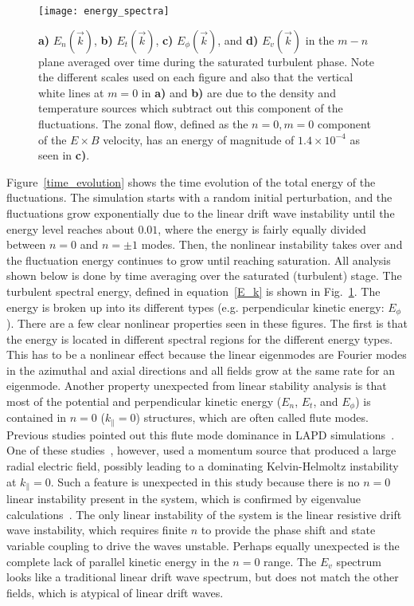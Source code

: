 \documentclass[showpacs,preprintnumbers,amsmath,amssymb,superscriptaddress,aip]{revtex4-1}
\def\para{\parallel}
\begin{document}
\begin{figure}[!htbp]
\texttt{[image: energy\_spectra]}
\hfil
\caption{\textbf{a)} $E_n(\vec{k})$, \textbf{b)} $E_t(\vec{k})$, \textbf{c)} $E_\phi(\vec{k})$, and \textbf{d)} $E_v(\vec{k})$ in the $m-n$ plane averaged over time during the saturated turbulent phase.
Note the different scales used on each figure and also that the vertical white lines at $m=0$ in \textbf{a)} and \textbf{b)} are due to the density and temperature sources which subtract out this
component of the fluctuations. The zonal flow, defined as the $n=0, m=0$ component of the $E \times B$ velocity, has an energy of magnitude of $1.4 \times 10^{-4}$ as seen in \textbf{c)}.}
\label{energy_figures}
\end{figure}

Figure~\ref{time_evolution} shows the time evolution of the total energy of the fluctuations. The simulation starts with a random initial perturbation, and the fluctuations grow
exponentially due to the linear drift wave instability until the energy level reaches about $0.01$, where the energy is fairly equally divided between $n=0$ and $n= \pm 1$ modes. 
Then, the nonlinear instability takes over and the fluctuation energy continues to grow
until reaching saturation. All analysis shown below is done by time averaging over the saturated (turbulent) stage.
The turbulent spectral energy, defined in equation~\ref{E_k} is shown in Fig.~\ref{energy_figures}. The energy is broken up into its different types (e.g. perpendicular kinetic energy: $E_\phi$).
There are a few clear nonlinear properties
seen in these figures. The first is that the energy is located in different spectral regions for the different energy types. This has to be a nonlinear effect because the linear eigenmodes
are Fourier modes in the azimuthal and axial directions and all fields grow at the same rate for an eigenmode. 
Another property unexpected from linear stability analysis is that most of the potential and perpendicular kinetic energy ($E_n$, $E_t$, and $E_\phi$) is contained in $n=0$ ($k_\para = 0$) 
structures, which are often called flute modes. Previous studies pointed out this flute mode dominance in LAPD simulations~\cite{rogers2010,Umansky2011}. One of these studies~\cite{rogers2010},
however, used a momentum source that produced a large radial electric field, possibly leading to a dominating Kelvin-Helmoltz instability at $k_\para = 0$.
Such a feature is unexpected in this study because there is no $n=0$ linear instability present in the system, which is confirmed by eigenvalue calculations~\cite{Popovich2010a}.
The only linear instability of the system is the
linear resistive drift wave instability, which requires finite $n$ to provide the phase shift and state variable coupling to drive the waves unstable. Perhaps equally unexpected is the complete
lack of parallel kinetic energy in the $n=0$ range. The $E_v$ spectrum looks like a traditional linear drift wave spectrum, but does not match the other fields, which is atypical of
linear drift waves.
\end{document}
